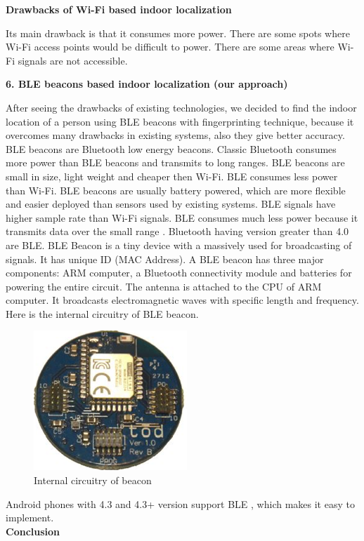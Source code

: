 \textbf{Drawbacks of Wi-Fi based indoor localization}

Its main drawback is that it consumes more power. There are some spots where Wi-Fi access points would be difficult to power. There are some areas where Wi-Fi signals are not accessible. \cite{cooper2016loco}

\textbf{6. BLE beacons based indoor localization (our approach)}

After seeing the drawbacks of existing technologies, we decided to find the indoor location of a person using BLE beacons with fingerprinting technique, because it overcomes many drawbacks in existing systems, also they give better accuracy.  BLE beacons are Bluetooth low energy beacons. Classic Bluetooth consumes more power than BLE beacons and transmits to long ranges. BLE beacons are small in size, light weight and cheaper then Wi-Fi. BLE consumes less power than Wi-Fi. BLE beacons are usually battery powered, which are more flexible and easier deployed than sensors used by existing systems. BLE signals have higher sample rate than Wi-Fi signals. BLE consumes much less power because it transmits data over the small range \cite{BLEguide}. Bluetooth having version greater than 4.0 are BLE. BLE Beacon is a tiny device with a massively used for broadcasting of signals. It has unique ID (MAC Address). A BLE beacon has three major components:  ARM computer, a Bluetooth connectivity module and batteries for powering the entire circuit. The antenna is attached to the CPU of ARM computer. It broadcasts electromagnetic waves with specific length and frequency. Here is the internal circuitry of BLE beacon.

\begin{figure}[h]
  		\centering
    		\includegraphics{./Figures/internalbeacon}
\caption{Internal circuitry of beacon}
\label{fig:3}
 		\end{figure}

Android phones with 4.3 and 4.3+ version support BLE \cite{BLEguide}, which makes it easy to implement. 
\\
\textbf{Conclusion}

